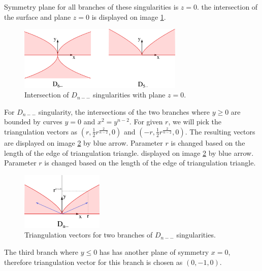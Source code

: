 \begin{definition}
Symmetry plane for all branches of these singularities is $z=0$.
the intersection of the surface and plane $z=0$ is displayed on image \ref{img:6}.

\begin{figure}
    \centerline{\includegraphics[width=0.7\textwidth]{images/img6}}
    \caption[Intersection of $D_{n--}$ singularities with plane $z=0$.]
    {Intersection of $D_{n--}$ singularities with plane $z=0$.}
    \label{img:6}
\end{figure}

For $D_{n--}$ singularity, the intersections of the two branches where
$y \geq 0$ are bounded by curves $y=0$ and $x^2=y^{n-2}$. For given $r$,
we will pick the triangulation vectors as $(r, \frac{1}{2}r^{\frac{2}{n-2}}, 0)$
and $(-r, \frac{1}{2}r^{\frac{2}{n-2}}, 0)$. The resulting vectors are
displayed on image \ref{img:9} by blue arrow. Parameter $r$ is changed based
on the length of the edge of triangulation triangle.
displayed on image \ref{img:9} by blue arrow. Parameter $r$ is changed based
on the length of the edge of triangulation triangle.

\begin{figure}
    \centerline{\includegraphics[width=0.35\textwidth]{images/img9}}
    \caption[Triangulation vectors for two branches of $D_{n--}$ singularities.]
    {Triangulation vectors for two branches of $D_{n--}$ singularities.}
    \label{img:9}
\end{figure}

The third branch where $y\leq0$ has has another plane of symmetry $x=0$,
therefore triangulation vector for this branch is chosen as $(0, -1, 0)$.


\end{definition}
